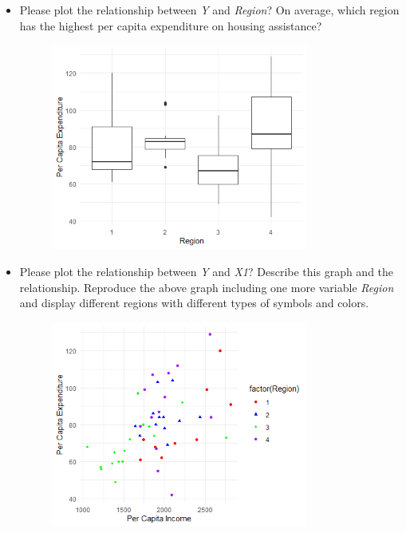 \documentclass[12pt,letterpaper]{article}
\begin{document}
\begin{itemize}
\begin{itemize}
\begin{figure}[H]
	\end{figure}
\end{itemize}
\item
Please plot the relationship between \emph{Y} and \emph{Region}? On average, which region has the highest per capita expenditure on housing assistance?
\vspace{.5cm}
 
\begin{figure}[H]
	\centering
	\includegraphics[width=0.8\textwidth]{3}
\end{figure}
\item
Please plot the relationship between \emph{Y} and \emph{X1}? Describe this graph and the relationship. Reproduce the above graph including one more variable \emph{Region} and display different regions with different types of symbols and colors.
\vspace{.5cm}
 
\begin{figure}[H]
	\centering
	\includegraphics[width=0.8\textwidth]{4}

\end{figure}
\end{itemize}
\end{document}
